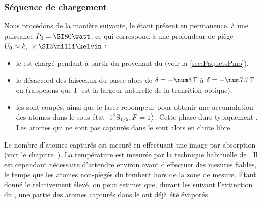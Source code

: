 \subsubsection{Séquence de chargement}
Nous procédons de la manière suivante, le \fld étant présent en permanence, à une puissance $P_0=\W{80}$, ce qui correspond à une profondeur de piège $\Uprof\approx\kb\times\milliK{3}$ :
\begin{itemize}
	\item le \pmobd est chargé pendant  à partir du \fat provenant du \ZS (voir la \autoref{sec:PaquetsPmo}). 
	\item le désaccord des faisceaux du \pmo passe alors de $\desac=-\val{3}\,\pulsSpont$ à $\desac=-\val{7.7}\,\pulsSpont$ en  (rappelons que ${\Gamma}$ est la largeur naturelle de la transition optique).
	\item les \chms sont coupés, ainsi que le laser repompeur pour obtenir une accumulation des atomes dans le sous-état ${{\left| {{5^2 {\rm S}_{{1}/{2}}}, F=1 } \right\rangle}}$. Cette phase dure typiquement . Les atomes qui ne sont pas capturés dans le \pd sont alors en chute libre.
\end{itemize}
%
Le nombre d'atomes capturés est mesuré en effectuant une image par absorption (voir le chapitre~). La température est mesurée par la technique habituelle de \termetech{\tof}.
Il est cependant nécessaire d'attendre environ  avant d'effectuer des mesures fiables, le temps que les atomes non-piégés du \pmo tombent hors de la zone de mesure.
%
Étant donné le \tcolel relativement élevé, on peut estimer que, durant les  suivant l'extinction du \pmo, une partie des atomes capturés dans le \pd ont déjà été évaporés.

